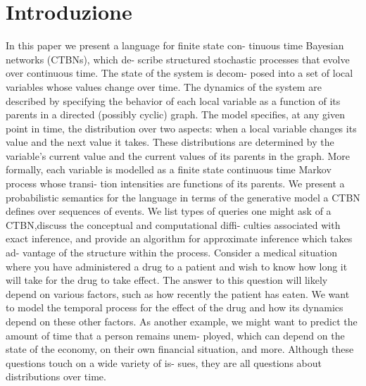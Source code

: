 
\cleardoublepage
{}
\chapter*{Introduzione}\label{cap:intro}

In this paper we present a language for finite state con- tinuous time Bayesian networks (CTBNs), which de- scribe structured stochastic processes that evolve over continuous time. The state of the system is decom- posed into a set of local variables whose values change over time. The dynamics of the system are described by specifying the behavior of each local variable as a function of its parents in a directed (possibly cyclic) graph. The model specifies, at any given point in time, the distribution over two aspects: when a local variable changes its value and the next value it takes. These distributions are determined by the variable’s current value and the current values of its parents in the graph. More formally, each variable is modelled as a finite state continuous time Markov process whose transi- tion intensities are functions of its parents. We present a probabilistic semantics for the language in terms of the generative model a CTBN defines over sequences of events. We list types of queries one might ask of a CTBN,discuss the conceptual and computational diffi- culties associated with exact inference, and provide an algorithm for approximate inference which takes ad- vantage of the structure within the process.
Consider a medical situation where you have administered a drug to a patient and wish to know how long it will take for the drug to take effect. The answer to this question will likely depend on various factors, such as how recently the patient has eaten. We want to model the temporal process for the effect of the drug and how its dynamics depend on these other factors. As another example, we might want to predict the amount of time that a person remains unem- ployed, which can depend on the state of the economy, on their own financial situation, and more.
Although these questions touch on a wide variety of is-
sues, they are all questions about distributions over time.

